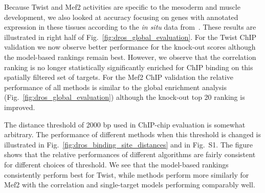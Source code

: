 \documentclass{pnastwo}
\begin{document}
\begin{article}

Because Twist and Mef2 activities are specific to the mesoderm and
muscle development, we also looked at accuracy focusing on genes
with annotated expression in these tissues according to the
\emph{in situ} data from~\cite{Tomancak2002}. These results are
illustrated in right half of
Fig.~\ref{fig:dros_global_evaluation}. For the Twist
ChIP validation we now observe better performance for the knock-out
scores although the model-based rankings remain best. However, we
observe that the correlation ranking is no longer statistically
significantly enriched for ChIP binding on this spatially filtered set
of targets. For the Mef2 ChIP validation the relative performance of
all methods is similar to the global enrichment analysis
(Fig.~\ref{fig:dros_global_evaluation}) although the knock-out top 20
ranking is improved.


The distance threshold of 2000 bp used in ChIP-chip evaluation is
somewhat arbitrary.  The performance of different methods when this
threshold is changed is illustrated in
Fig.~\ref{fig:dros_binding_site_distances} and in Fig.~S1.
The figure shows that the relative performances of
different algorithms are fairly consistent for different choices of threshold. 
We see that the model-based rankings consistently perform best for Twist, while 
methods perform more similarly for Mef2 with the correlation and single-target models 
performing comparably well.


\end{article}
\end{document}
